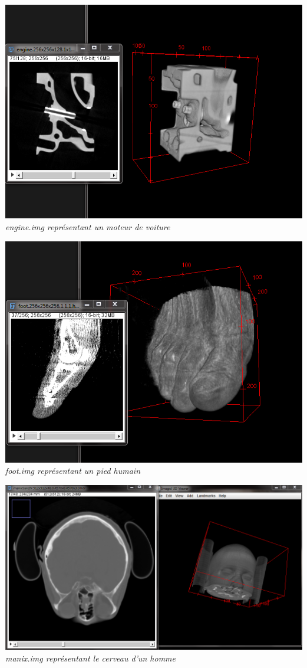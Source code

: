 \documentclass[a4paper,11pt]{article}
\begin{document}
\begin{center}
\includegraphics[scale=0.4]{engine.png}\\
\textit{engine.img représentant un moteur de voiture}
\end{center}

\begin{center}
\includegraphics[scale=0.4]{footix.png}\\
\textit{foot.img représentant un pied humain}
\end{center}

\begin{center}
\includegraphics[scale=0.4]{manix.png}\\
\textit{manix.img représentant le cerveau d'un homme}
\end{center}
\end{document}
